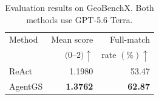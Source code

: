 \begin{table}[t]
\caption{Evaluation results on GeoBenchX. Both methods use GPT-5.6 Terra.}
\label{tab:external-results}
\centering
\begin{tabularx}{\columnwidth}{@{}Xrr@{}}
\toprule
Method & Mean score & Full-match \\
 & $(0$--$2)\uparrow$ & rate $(\%)\uparrow$ \\
\midrule
ReAct & 1.1980 & 53.47 \\
AgentGS & \textbf{1.3762} & \textbf{62.87} \\
\bottomrule
\end{tabularx}
\end{table}
